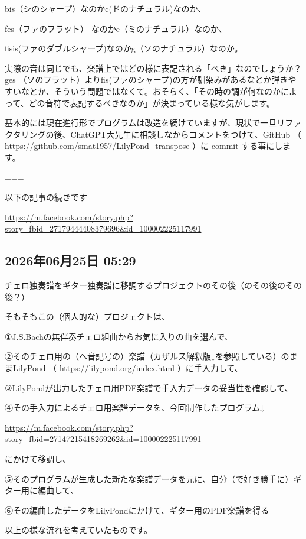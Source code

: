 bis（シのシャープ）なのかc(ドのナチュラル)なのか、

fes（ファのフラット） なのかe（ミのナチュラル）なのか、

fisis(ファのダブルシャープ)なのかg（ソのナチュラル）なのか。

実際の音は同じでも、楽譜上ではどの様に表記される「べき」なのでしょうか？ges （ソのフラット）よりfis(ファのシャープ)の方が馴染みがあるなとか弾きやすいなとか、そういう問題ではなくて。おそらく、「その時の調が何なのかによって、どの音符で表記するべきなのか」が決まっている様な気がします。

基本的には現在進行形でプログラムは改造を続けていますが、現状で一旦リファクタリングの後、ChatGPT大先生に相談しなからコメントをつけて、GitHub （ \url{https://github.com/smat1957/LilyPond_transpose} ）に commit する事にします。

===

以下の記事の続きです

\url{https://m.facebook.com/story.php?story_fbid=27179444408379696&id=100002225117991}

\subsection*{2026年06月25日 05:29}

チェロ独奏譜をギター独奏譜に移調するプロジェクトのその後（のその後のその後？）

そもそもこの（個人的な）プロジェクトは、

①J.S.Bachの無伴奏チェロ組曲からお気に入りの曲を選んで、

②そのチェロ用の（ヘ音記号の）楽譜（カザルス解釈版↓を参照している）のままLilyPond （ \url{https://lilypond.org/index.html} ）に手入力して、

③LilyPondが出力したチェロ用PDF楽譜で手入力データの妥当性を確認して、

④その手入力によるチェロ用楽譜データを、今回制作したプログラム↓

\url{https://m.facebook.com/story.php?story_fbid=27147215418269262&id=100002225117991}

にかけて移調し、

⑤そのプログラムが生成した新たな楽譜データを元に、自分（で好き勝手に）ギター用に編曲して、

⑥その編曲したデータをLilyPondにかけて、ギター用のPDF楽譜を得る

以上の様な流れを考えていたものです。

